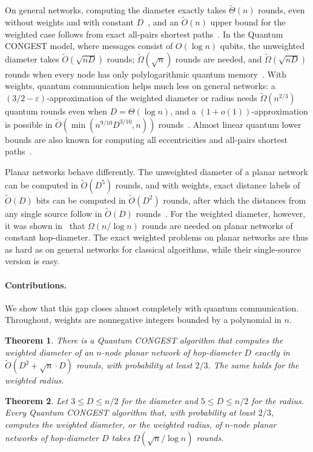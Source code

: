 \documentclass[11pt]{article}
\newtheorem{theorem}{Theorem}[section]
\theoremstyle{definition}
\theoremstyle{remark}
\newcommand{\Ot}{\tilde O}
\begin{document}
On general networks, computing the diameter exactly takes $\tilde\Theta(n)$ rounds, even without weights and with constant $D$~\cite{FHW12,ACHK16,HW12}, and an $\Ot(n)$ upper bound for the weighted case follows from exact all-pairs shortest paths~\cite{BN19}. In the Quantum CONGEST model, where messages consist of $O(\log n)$ qubits, the unweighted diameter takes $\Ot(\sqrt{nD})$ rounds; $\tilde\Omega(\sqrt n)$ rounds are needed, and $\tilde\Omega(\sqrt{nD})$ rounds when every node has only polylogarithmic quantum memory~\cite{LM18}. With weights, quantum communication helps much less on general networks: a $(3/2-\varepsilon)$-approximation of the weighted diameter or radius needs $\tilde\Omega(n^{2/3})$ quantum rounds even when $D = \Theta(\log n)$, and a $(1+o(1))$-approximation is possible in $\Ot(\min(n^{9/10}D^{3/10}, n))$ rounds~\cite{WY22}. Almost linear quantum lower bounds are also known for computing all eccentricities and all-pairs shortest paths~\cite{WWY22}.

Planar networks behave differently. The unweighted diameter of a planar network can be computed in $\Ot(D^5)$ rounds, and with weights, exact distance labels of $\Ot(D)$ bits can be computed in $\Ot(D^2)$ rounds, after which the distances from any single source follow in $\Ot(D)$ rounds~\cite{LP19}. For the weighted diameter, however, it was shown in~\cite{ACK20} that $\Omega(n/\log n)$ rounds are needed on planar networks of constant hop-diameter. The exact weighted problems on planar networks are thus as hard as on general networks for classical algorithms, while their single-source version is easy.

\paragraph{Contributions.} We show that this gap closes almost completely with quantum communication. Throughout, weights are nonnegative integers bounded by a polynomial in $n$.

\begin{theorem}\label{thm:upper}
There is a Quantum CONGEST algorithm that computes the weighted diameter of an $n$-node planar network of hop-diameter $D$ exactly in $\Ot(D^2+\sqrt n \cdot D)$ rounds, with probability at least $2/3$. The same holds for the weighted radius.
\end{theorem}

\begin{theorem}\label{thm:qlower}
Let $3\le D\le n/2$ for the diameter and $5\le D\le n/2$ for the radius. Every Quantum CONGEST algorithm that, with probability at least $2/3$, computes the weighted diameter, or the weighted radius, of $n$-node planar networks of hop-diameter $D$ takes $\Omega(\sqrt n/\log n)$ rounds.
\end{theorem}
\end{document}
